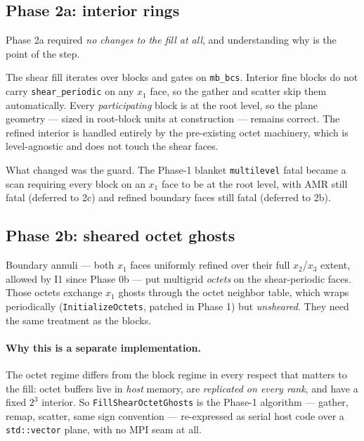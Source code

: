 \documentclass[11pt]{article}
\newcommand{\code}[1]{\texttt{#1}}
\newcommand{\fn}[1]{\texttt{\small #1}}
\begin{document}
\subsection{Phase 2a: interior rings}
\label{sec:phase2a}

Phase 2a required \emph{no changes to the fill at all}, and understanding why is the
point of the step.

The shear fill iterates over blocks and gates on \code{mb\_bcs}. Interior fine blocks
do not carry \code{shear\_periodic} on any $x_1$ face, so the gather and scatter skip
them automatically. Every \emph{participating} block is at the root level, so the
plane geometry --- sized in root-block units at construction --- remains correct. The
refined interior is handled entirely by the pre-existing octet machinery, which is
level-agnostic and does not touch the shear faces.

What changed was the guard. The Phase-1 blanket \code{multilevel} fatal became a
scan requiring every block on an $x_1$ face to be at the root level, with AMR still
fatal (deferred to 2c) and refined boundary faces still fatal (deferred to 2b).

\subsection{Phase 2b: sheared octet ghosts}
\label{sec:phase2b}

Boundary annuli --- both $x_1$ faces uniformly refined over their full $x_2$/$x_3$
extent, allowed by I1 since Phase 0b --- put multigrid \emph{octets} on the
shear-periodic faces. Those octets exchange $x_1$ ghosts through the octet neighbor
table, which wraps periodically (\fn{InitializeOctets}, patched in Phase 1) but
\emph{unsheared}. They need the same treatment as the blocks.

\paragraph{Why this is a separate implementation.} The octet regime differs from the
block regime in every respect that matters to the fill: octet buffers live in
\emph{host} memory, are \emph{replicated on every rank}, and have a fixed $2^3$
interior. So \fn{FillShearOctetGhosts} is the Phase-1 algorithm --- gather, remap,
scatter, same sign convention --- re-expressed as serial host code over a
\code{std::vector} plane, with no MPI seam at all.
\end{document}
